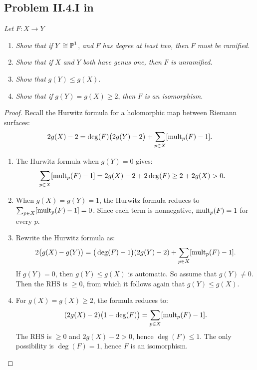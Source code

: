 \documentclass{article}
\begin{document}
\subsection*{Problem II.4.I in \cite{Mir}}
\textit{Let} $F:X\to Y$ 
\begin{enumerate}
\item \textit{Show that if} $Y \cong \operatorname{\mathbb{P}}^1$, \textit{and} $F$ \textit{has degree at least two, then}
$F$ \textit{must be ramified.}
\item \textit{Show that if} $X$ \textit{and} $Y$ \textit{both have genus one, then} $F$ \textit{is
unramified.}
\item \textit{Show that} $g(Y)\leq g(X)$.
\item \textit{Show that if} $g(Y) = g(X) \geq 2$, \textit{then} $F$ \textit{is an isomorphism.}
\end{enumerate}
\begin{proof}
Recall the Hurwitz formula for a holomorphic map between Riemann surfaces:
\[	2g(X) - 2 = \deg(F)\big(2g(Y) - 2\big) + \sum_{p\in X} [\operatorname{mult}_p(F) - 1].	\]
\begin{enumerate}
\item The Hurwitz formula when $g(Y) = 0$ gives:
\begin{align*}
\sum_{p\in X} [\operatorname{mult}_p(F) - 1] &= 2g(X) - 2 + 2\deg(F) \geq 2 + 2g(X) > 0.
\end{align*}
\item When $g(X) = g(Y) = 1$, the Hurwitz formula reduces to $\sum_{p\in X} [\operatorname{mult}_p(F) - 1] = 0$.
Since each term is nonnegative, $\operatorname{mult}_p(F) = 1$ for every $p$.
\item Rewrite the Hurwitz formula as:
\[	2\big(g(X) - g(Y)\big) = \big(\deg(F) - 1\big)(2g(Y) - 2) + \sum_{p\in X} [\operatorname{mult}_p(F) - 1].	\]
If $g(Y) = 0$, then $g(Y) \leq g(X)$ is automatic. So assume that $g(Y) \neq 0$. Then the RHS is
$\geq 0$, from which it follows again that $g(Y) \leq g(X)$.
\item For $g(X) = g(X) \geq 2$, the formula reduces to:
\[	(2g(X) - 2)\big(1-\deg(F)\big) = \sum_{p\in X} [\operatorname{mult}_p(F) - 1].	\]
The RHS is $\geq 0$ and $2g(X) - 2 > 0$, hence $\deg(F) \leq 1$. The only possibility is $\deg(F) = 1$,
hence $F$ is an isomorphism.
\end{enumerate}
\end{proof}
\end{document}
